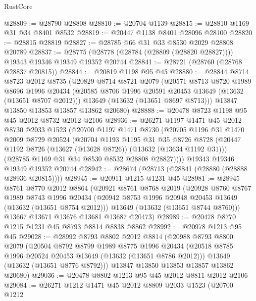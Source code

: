 \begin{lexlean}{RustCore}
\begin{coremodule}
@28809 := @28790 @28808
@28810 := @20704 @1139
@28815 := @28810 @1169 @31 @34 @8401 @8532
@28819 := @20447 @1138 @8401 @28096 @28100
@28820 := @28815 @28819
@28827 := @28785 @66 @31 @33 @8530 @2029 @28808 @20789
@28837 := @28775 (@28778 (@28784 (@28809 (@28820 @28827)))) @19343 @19346 @19349 @19352 @20744
@28841 := @28721 (@28760 (@28768 @28837 @20815))
@28844 := @20819 @1198 @95 @45
@28880 := @28844
    @8714
    @8723
    @2012
    @8735
    (@20829
      @8714
      @8721
      @2079
      (@20571
        @8713
        @8720
        @1989
        @8696
        @1996
        @20434
        (@20585 @8706 @1996 @20591 @20453 @13649 (@13632 (@13651 @8707 @2012)))
        @13649
        (@13632 (@13651 @8697 @8713)))
      @13847
      @13850
      @13853
      @13857
      @13862
      @20680)
@28888 := @20478 @8723 @1198 @95 @45 @2012 @8732 @2012 @2106
@28936 := @26271
    @1197
    @1471
    @45
    @2012
    @8730
    @2033
    @1523
    (@20700
      @1197
      @1471
      @8730
      (@20705
        @1196
        @31
        @1470
        @2009
        @8729
        @20524
        (@20704
          @1193
          @1195
          @31
          @35
          @8726
          @8728
          (@20447 @1192 @8726 (@13627 (@13628 @8726)) (@13632 (@13634 @1192 @31)))
          (@28785 @1169 @31 @34 @8530 @8532 @28808 @28827))))
    @19343
    @19346
    @19349
    @19352
    @20744
@28942 := @28674 (@28713 (@28841 (@28880 (@28888 @28936 @20815))))
@28945 := @20911 @1215 @1231 @45
@28981 := @28945
    @8761
    @8770
    @2012
    @8864
    (@20921
      @8761
      @8768
      @2019
      (@20928
        @8760
        @8767
        @1989
        @8743
        @1996
        @20434
        (@20942 @8753 @1996 @20948 @20453 @13649 (@13632 (@13651 @8754 @2012)))
        @13649
        (@13632 (@13651 @8744 @8760)))
      @13667
      @13671
      @13676
      @13681
      @13687
      @20473)
@28989 := @20478 @8770 @1215 @1231 @45 @8793 @8814 @8838 @8862
@28992 := @20978 @1213 @95 @45
@29028 := @28992
    @8793
    @8802
    @2012
    @8814
    (@20988
      @8793
      @8800
      @2079
      (@20504
        @8792
        @8799
        @1989
        @8775
        @1996
        @20434
        (@20518 @8785 @1996 @20524 @20453 @13649 (@13632 (@13651 @8786 @2012)))
        @13649
        (@13632 (@13651 @8776 @8792)))
      @13847
      @13850
      @13853
      @13857
      @13862
      @20680)
@29036 := @20478 @8802 @1213 @95 @45 @2012 @8811 @2012 @2106
@29084 := @26271
    @1212
    @1471
    @45
    @2012
    @8809
    @2033
    @1523
    (@20700
      @1212

\end{coremodule}
\end{lexlean}
